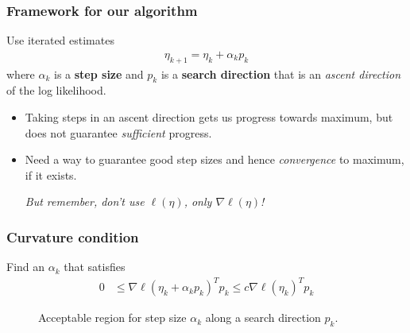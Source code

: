 \documentclass[ 10pt]{beamer}
\begin{document}
\frame
{
\frametitle{Framework for our algorithm}
Use iterated estimates
\begin{align*}
	\eta_{k+1} = \eta_k + \alpha_k p_k
\end{align*}
where $\alpha_k$ is a \textbf{step size} and  $p_k$ is a \textbf{search direction} that
is an \emph{ascent direction} of the log likelihood.
\vspace{3mm}

\pause
\begin{itemize}
\item Taking steps in an ascent direction gets us progress towards maximum, but does not guarantee \emph{sufficient} progress.
\vspace{3mm}

\item Need a way to guarantee good step sizes and hence \emph{convergence} to maximum, if it exists.
\vspace{2mm}

\emph{But remember, don't use $\ell(\eta)$, only $\nabla \ell(\eta) $!}
\end{itemize}

}
\frame
{
  \frametitle{Curvature condition}
Find an $\alpha_k$ that satisfies
\begin{align*}
	 0 & \leq \nabla \ell( \eta_k + \alpha_k p_k)^T p_k \leq c \nabla \ell(\eta_k)^T 
p_k
\end{align*}
\begin{figure}[h]
\centering
    \scalebox{.25}{}
	\caption{Acceptable region for step size $\alpha_k$ along a search direction $p_k$.}
\label{F:alpha_region}
\end{figure}
}
\end{document}
